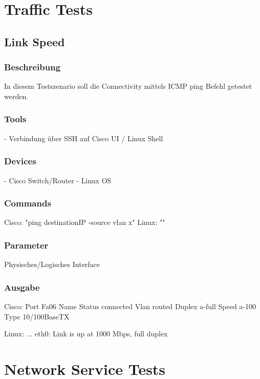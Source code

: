 \documentclass[a4,12pt]{scrartcl}
\begin{document}
\newpage
\section{Traffic Tests}
\subsection{Link Speed}
\subsubsection{Beschreibung}
In diesem Testszenario soll die Connectivity mittels ICMP ping Befehl getestet werden.
\subsubsection{Tools}
- Verbindung über SSH auf Cisco UI / Linux Shell

\subsubsection{Devices}
- Cisco Switch/Router
- Linux OS
\subsubsection{Commands}
Cisco: "ping destinationIP -source vlan x"
Linux: ""
\subsubsection{Parameter}
Physisches/Logisches Interface
\subsubsection{Ausgabe}
Cisco: Port Fa06	Name 	Status connected	Vlan routed	Duplex a-full	Speed a-100	Type 10/100BaseTX

Linux: ... eth0: Link is up at 1000 Mbps, full duplex
\newpage
\section{Network Service Tests}
\end{document}
